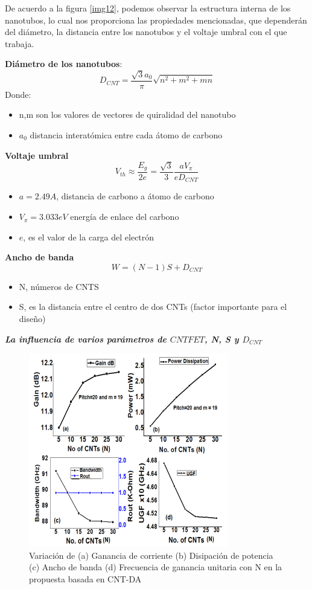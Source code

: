 \documentclass[conference]{IEEEtran} %
\begin{document}
De acuerdo a la figura \ref{img12}, podemos observar la estructura interna de los nanotubos, lo cual nos proporciona las propiedades mencionadas, que dependerán del diámetro, la distancia entre los nanotubos y el voltaje umbral con el que trabaja.

\textbf{Diámetro de los nanotubos}:
\begin{equation}
	D_{CNT} =  \frac{\sqrt{3}a_0}{\pi}\sqrt{n^2 + m^2 + mn}
\end{equation}
Donde:
\begin{itemize}
	\item n,m son los valores de vectores de quiralidad del nanotubo
	\item $a_0$ distancia interatómica entre cada átomo de carbono
\end{itemize}

\textbf{Voltaje umbral}
\begin{equation}
	V_{th}\approx \frac{E_g}{2e} = \frac{\sqrt{3}}{3}\frac{a V_{\pi}}{eD_{CNT}}
\end{equation}
\begin{itemize}
	\item $a= 2.49A$, distancia de carbono a átomo de carbono
	\item $V_{\pi} = 3.033eV$ energía de enlace del carbono
	\item $e$, es el valor de la carga del electrón
\end{itemize}

\textbf{Ancho de banda}
\begin{equation}
	W = (N-1)S+D_{CNT}
\end{equation}
\begin{itemize}
	\item N, números de CNTS
	\item S, es la distancia entre el centro de dos CNTs (factor importante para el diseño)
\end{itemize}
\textbf{\textit{La influencia de varios parámetros de $CNTFET$, N, S y $D_{CNT}$}}

\begin{figure}
	\centering
	\includegraphics[scale=0.6]{IMAGENES/4.PNG}
	\caption{Variación de (a) Ganancia de corriente (b) Disipación de potencia (c) Ancho de banda (d) Frecuencia de ganancia unitaria con N en la propuesta basada en CNT-DA\cite{Akhoon}}
\end{figure}
\end{document}
